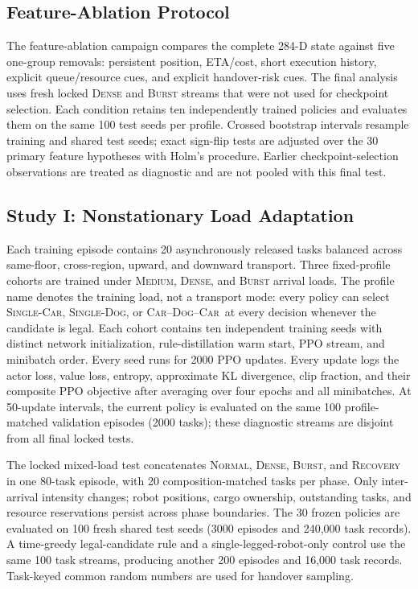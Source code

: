 \documentclass[journal]{IEEEtran}
\DeclareRobustCommand{\modecar}{\mbox{\textsc{Single-Car}}\xspace}
\DeclareRobustCommand{\modedog}{\mbox{\textsc{Single-Dog}}\xspace}
\DeclareRobustCommand{\modechain}{\mbox{\textsc{Car--Dog--Car}}\xspace}
\begin{document}
\subsection{Feature-Ablation Protocol}

The feature-ablation campaign compares the complete 284-D state against five one-group removals: persistent position, ETA/cost, short execution history, explicit queue/resource cues, and explicit handover-risk cues. The final analysis uses fresh locked \textsc{Dense} and \textsc{Burst} streams that were not used for checkpoint selection. Each condition retains ten independently trained policies and evaluates them on the same 100 test seeds per profile. Crossed bootstrap intervals resample training and shared test seeds; exact sign-flip tests are adjusted over the 30 primary feature hypotheses with Holm's procedure. Earlier checkpoint-selection observations are treated as diagnostic and are not pooled with this final test.

\subsection{Study I: Nonstationary Load Adaptation}

Each training episode contains 20 asynchronously released tasks balanced across same-floor, cross-region, upward, and downward transport. Three fixed-profile cohorts are trained under \textsc{Medium}, \textsc{Dense}, and \textsc{Burst} arrival loads. The profile name denotes the training load, not a transport mode: every policy can select \modecar, \modedog, or \modechain{}~at every decision whenever the candidate is legal. Each cohort contains ten independent training seeds with distinct network initialization, rule-distillation warm start, PPO stream, and minibatch order. Every seed runs for 2000 PPO updates. Every update logs the actor loss, value loss, entropy, approximate KL divergence, clip fraction, and their composite PPO objective after averaging over four epochs and all minibatches. At 50-update intervals, the current policy is evaluated on the same 100 profile-matched validation episodes (2000 tasks); these diagnostic streams are disjoint from all final locked tests.

The locked mixed-load test concatenates \textsc{Normal}, \textsc{Dense}, \textsc{Burst}, and \textsc{Recovery} in one 80-task episode, with 20 composition-matched tasks per phase. Only inter-arrival intensity changes; robot positions, cargo ownership, outstanding tasks, and resource reservations persist across phase boundaries. The 30 frozen policies are evaluated on 100 fresh shared test seeds (3000 episodes and 240,000 task records). A time-greedy legal-candidate rule and a single-legged-robot-only control use the same 100 task streams, producing another 200 episodes and 16,000 task records. Task-keyed common random numbers are used for handover sampling.
\end{document}
